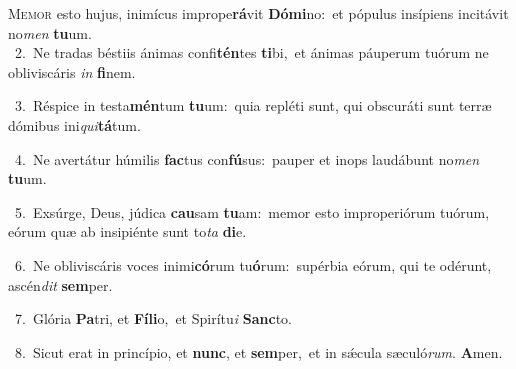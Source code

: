 \lettrine{\initial\textcolor{\initialcolor}{M}}{emor} esto hujus, inimícus imprope\-\textbf{rá}\-vit \textbf{Dó}\-\textbf{mi}no:~\star et pópulus insípiens incitávit no\textit{men} \textbf{tu}\-um.\\
{\numbfont\textcolor{\numbcolor}{~2.}}~Ne tradas béstiis ánimas confi\-\textbf{tén}\-tes \textbf{ti}\-bi,~\star et ánimas páuperum tuórum ne obliviscáris \textit{in} \textbf{fi}\-nem.\par
{\numbfont\textcolor{\numbcolor}{~3.}}~Réspice in testa\-\textbf{mén}\-tum \textbf{tu}\-um:~\star quia repléti sunt, qui obscuráti sunt terræ dómibus ini\-\textit{qui}\-\textbf{tá}tum.\par
{\numbfont\textcolor{\numbcolor}{~4.}}~Ne avertátur húmilis \textbf{fac}\-tus con\-\textbf{fú}\-sus:~\star pauper et inops laudábunt no\textit{men} \textbf{tu}\-um.\par
{\numbfont\textcolor{\numbcolor}{~5.}}~Exsúrge, Deus, júdica \textbf{cau}\-sam \textbf{tu}\-am:~\star memor esto improperiórum tuórum, eórum quæ ab insipiénte sunt to\textit{ta} \textbf{di}\-e.\par
{\numbfont\textcolor{\numbcolor}{~6.}}~Ne obliviscáris voces inimi\-\textbf{có}\-rum tu\-\textbf{ó}\-rum:~\star supérbia eórum, qui te odérunt, ascén\textit{dit} \textbf{sem}\-per.\par
{\numbfont\textcolor{\numbcolor}{~7.}}~Glória \textbf{Pa}\-tri, et \textbf{Fí}\-\textbf{li}o,~\star et Spirítu\textit{i} \textbf{Sanc}\-to.\par
{\numbfont\textcolor{\numbcolor}{~8.}}~Sicut erat in princípio, et \textbf{nunc}\-, et \textbf{sem}\-per,~\star et in sǽcula sæculó\-\textit{rum}\-. \textbf{A}\-men.\par
